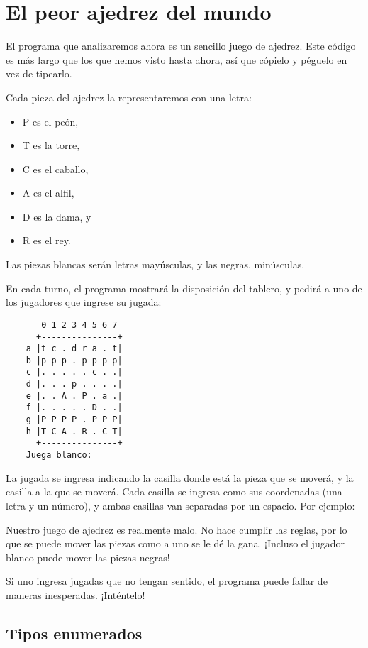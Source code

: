 \section{El peor ajedrez del mundo}

El programa que analizaremos ahora es un sencillo juego de ajedrez. Este
código es más largo que los que hemos visto hasta ahora, así que cópielo
y péguelo en vez de tipearlo.

Cada pieza del ajedrez la representaremos con una letra:

\begin{itemize}
\item
  P es el peón,
\item
  T es la torre,
\item
  C es el caballo,
\item
  A es el alfil,
\item
  D es la dama, y
\item
  R es el rey.
\end{itemize}

Las piezas blancas serán letras mayúsculas, y las negras, minúsculas.

En cada turno, el programa mostrará la disposición del tablero, y pedirá
a uno de los jugadores que ingrese su jugada:

\begin{verbatim}
       0 1 2 3 4 5 6 7
      +---------------+
    a |t c . d r a . t|
    b |p p p . p p p p|
    c |. . . . . c . .|
    d |. . . p . . . .|
    e |. . A . P . a .|
    f |. . . . . D . .|
    g |P P P P . P P P|
    h |T C A . R . C T|
      +---------------+
    Juega blanco: 

\end{verbatim}

La jugada se ingresa indicando la casilla donde está la pieza que se
moverá, y la casilla a la que se moverá. Cada casilla se ingresa como
sus coordenadas (una letra y un número), y ambas casillas van separadas
por un espacio. Por ejemplo:

Nuestro juego de ajedrez es realmente malo. No hace cumplir las reglas,
por lo que se puede mover las piezas como a uno se le dé la gana.
¡Incluso el jugador blanco puede mover las piezas negras!

Si uno ingresa jugadas que no tengan sentido, el programa puede fallar
de maneras inesperadas. ¡Inténtelo!

\subsection{Tipos enumerados}


